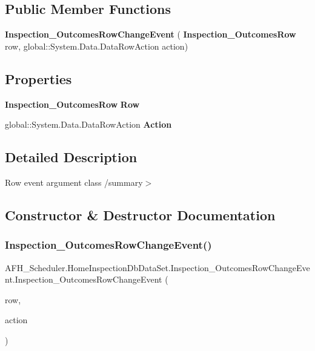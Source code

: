 \subsection*{Public Member Functions}
\begin{DoxyCompactItemize}
\item 
\textbf{ Inspection\+\_\+\+Outcomes\+Row\+Change\+Event} (\textbf{ Inspection\+\_\+\+Outcomes\+Row} row, global\+::\+System.\+Data.\+Data\+Row\+Action action)
\end{DoxyCompactItemize}
\subsection*{Properties}
\begin{DoxyCompactItemize}
\item 
\textbf{ Inspection\+\_\+\+Outcomes\+Row} \textbf{ Row}\hspace{0.3cm}{\ttfamily  [get]}
\item 
global\+::\+System.\+Data.\+Data\+Row\+Action \textbf{ Action}\hspace{0.3cm}{\ttfamily  [get]}
\end{DoxyCompactItemize}


\subsection{Detailed Description}
Row event argument class /summary$>$ 

\subsection{Constructor \& Destructor Documentation}
\mbox{\label{class_a_f_h___scheduler_1_1_home_inspection_db_data_set_1_1_inspection___outcomes_row_change_event_af4ae03b8b8d4ba7e973e8511674b2d50}} 
\subsubsection{Inspection\_OutcomesRowChangeEvent()}
{\footnotesize\ttfamily A\+F\+H\+\_\+\+Scheduler.\+Home\+Inspection\+Db\+Data\+Set.\+Inspection\+\_\+\+Outcomes\+Row\+Change\+Event.\+Inspection\+\_\+\+Outcomes\+Row\+Change\+Event (\begin{DoxyParamCaption}\item[{\textbf{ Inspection\+\_\+\+Outcomes\+Row}}]{row,  }\item[{global\+::\+System.\+Data.\+Data\+Row\+Action}]{action }\end{DoxyParamCaption})}



